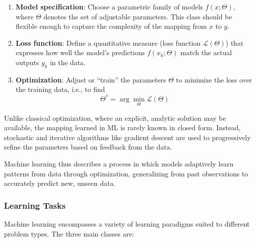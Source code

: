 \begin{enumerate}
    \item \textbf{Model specification}: Choose a parametric family of models $f(x;\Theta)$, where $\Theta$ denotes the set of adjustable parameters. This class should be flexible enough to capture the complexity of the mapping from $x$ to $y$.
    \item \textbf{Loss function}: Define a quantitative measure (loss function $\mathcal{L}(\Theta)$) that expresses how well the model’s predictions $f(x_k;\Theta)$ match the actual outputs $y_k$ in the data.
    \item \textbf{Optimization}: Adjust or ``train'' the parameters $\Theta$ to minimize the loss over the training data, i.e., to find
          $$
          \Theta^* = \arg\min_\Theta \mathcal{L}(\Theta)
          $$
\end{enumerate}

\begin{exampleblock}
    Unlike classical optimization, where an explicit, analytic solution may be available, the mapping learned in ML is rarely known in closed form. Instead, stochastic and iterative algorithms like gradient descent are used to progressively refine the parameters based on feedback from the data.
\end{exampleblock}

Machine learning thus describes a process in which models adaptively learn patterns from data through optimization, generalizing from past observations to accurately predict new, unseen data.

\subsubsection{Learning Tasks}

Machine learning encompasses a variety of learning paradigms suited to different problem types. The three main classes are:


